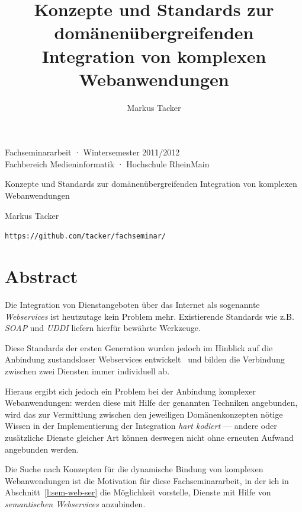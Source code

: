 \documentclass[10pt,a4paper]{article}
\begin{document}
\author{Markus Tacker}
\title{Konzepte und Standards zur domänenübergreifenden Integration von komplexen Webanwendungen}

\begin{center}

\begin{small}Fachseminararbeit · Wintersemester 2011/2012\\Fachbereich Medieninformatik · Hochschule RheinMain\end{small}

\bigskip

\begin{huge}Konzepte und Standards 
\medskip
zur domänenübergreifenden Integration
\medskip
von komplexen Webanwendungen\end{huge}

\bigskip

\begin{large}Markus Tacker\end{large}

\begin{small}\texttt{https://github.com/tacker/fachseminar/}\end{small}

\end{center}

\section*{Abstract}

Die Integration von Dienstangeboten über das Internet als sogenannte 
\emph{Webservices} ist heutzutage kein Problem mehr. Existierende Standards
wie z.B. \emph{\ac{SOAP}} und \emph{\ac{UDDI}} liefern hierfür bewährte Werkzeuge.

Diese Standards der ersten Generation wurden jedoch im Hinblick auf 
die Anbindung zustandsloser Webservices entwickelt~\cite[S. 653]{ei-sawsdl} 
und bilden die Verbindung zwischen zwei Diensten immer individuell ab.

Hieraus ergibt sich jedoch ein Problem bei der Anbindung komplexer 
Webanwendungen: werden diese mit Hilfe der genannten Techniken 
angebunden, wird das zur Vermittlung zwischen den jeweiligen Domänenkonzepten
nötige Wissen in der Implementierung der Integration \emph{hart kodiert} --- 
andere oder zusätzliche Dienste gleicher Art können deswegen nicht ohne erneuten
Aufwand angebunden werden.

Die Suche nach Konzepten für die dynamische Bindung von komplexen Webanwendungen
ist die Motivation für diese Fachseminararbeit, in der ich in Abschnitt~\ref{l:sem-web-ser} 
die Möglichkeit vorstelle, Dienste mit Hilfe von \emph{semantischen Webservices} 
anzubinden. 
\end{document}
